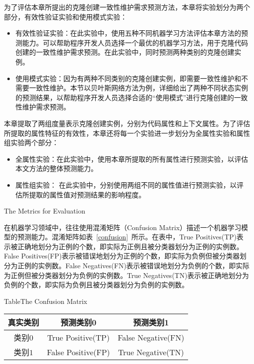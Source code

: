 
为了评估本章所提出的克隆创建一致性维护需求预测方法，本章将实验划分为两个部分，有效性验证实验和使用模式实验：
\begin{itemize}
\item
有效性验证实验：在此实验中，使用五种不同机器学习方法评估本章方法的预测能力。可以帮助程序开发人员选择一个最优的机器学习方法，用于克隆代码创建的一致性维护需求预测。在此实验中，同时预测两种类别的克隆创建实例。
\item
使用模式实验：因为有两种不同类别的克隆创建实例，即需要一致性维护和不需要一致性维护。本节以贝叶斯网络方法为例，详细给出了两种不同状态实例的预测结果，以帮助程序开发人员选择合适的“使用模式”进行克隆创建的一致性维护需求预测。
\end{itemize}

本章提取了两组度量表示克隆创建实例，分别为代码属性和上下文属性。为了评估所提取的属性特征的有效性，本章还将每一个实验进一步划分为全属性实验和属性组实验两个部分：
\begin{itemize}
\item
全属性实验：在此实验中，使用本章所提取的所有属性进行预测实验，以评估本文方法的整体预测能力。
\item
属性组实验：
在此实验中，分别使用两组不同的属性值进行预测实验，以评估所提取的属性值对预测结果的影响程度。
\end{itemize}

{The Metrics for Evaluation }
\label{ref-creatingmetrics}

在机器学习领域中，往往使用混淆矩阵（Confusion Matrix）描述一个机器学习模型的预测能力。混淆矩阵如表~\ref{confusion}~所示。在表中，True Positives(TP)表示被正确地划分为正例的个数，即实际为正例且被分类器划分为正例的实例数。False Positives(FP)表示被错误地划分为正例的个数，即实际为负例但被分类器划分为正例的实例数。False Negatives(FN)表示被错误地划分为负例的个数，即实际为正例但被分类器划分为负例的实例数。True Negatives(TN)表示被正确地划分为负例的个数，即实际为负例且被分类器划分为负例的实例数。　　​

\begin{table}[htbp]
{Table$\!$}{The Confusion Matrix}
\vspace{0.5em}
\centering
\wuhao
\begin{tabular}{ccc}
\toprule[1.5pt]
{真实类别}&{预测类别0}&{预测类别1}\\ 
\midrule[1pt]
类别$0$&True Positive(TP)	&False Negative(FN)\\
类别$1$&False Positive(FP)	&True Negative(TN)\\
\bottomrule[1.5pt]
\end{tabular}
\end{table}

